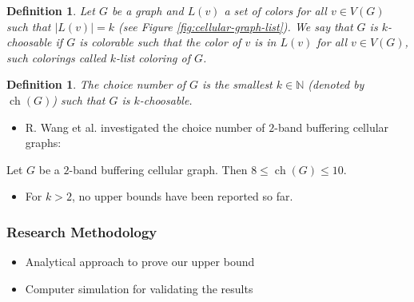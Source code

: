 \documentclass{beamer} %
\newtheorem{defi}[lem]{Definition}
\DeclareMathOperator{\ch}{ch}
\begin{document}
\begin{frame}[allowframebreaks]
\begin{defi} Let $G$ be a graph and $L(v)$ a set of colors for all $v \in V(G)$ such that $|L(v)|=k$ (see Figure \ref{fig:cellular-graph-list}). We say that $G$ is $k$\textit{-choosable} if $G$ is colorable such that the color of $v$ is in $L(v)$ for all $v \in V(G)$, such colorings called $k$\textit{-list coloring} of $G$.
\end{defi}
\begin{defi} The \textit{choice number} of $G$ is the smallest $k \in \mathbb{N}$ (denoted by $\ch(G)$) such that $G$ is $k$-choosable.
\end{defi}
\framebreak
\begin{itemize}
\item R. Wang et al. \cite{7248845} investigated the choice number of $2$-band buffering cellular graphs:
\end{itemize}
\begin{theorem}
Let $G$ be a $2$-band buffering cellular graph. Then $8 \leqslant \ch(G) \leqslant 10$.
\end{theorem}
\begin{itemize}
\item For $k > 2$, no upper bounds have been reported so far.
\end{itemize}
\end{frame}
\begin{frame}
\justifying
\frametitle{Research Methodology}
\begin{itemize}
\item Analytical approach to prove our upper bound
\item Computer simulation for validating the results
\end{itemize}
\end{frame}
\end{document}
